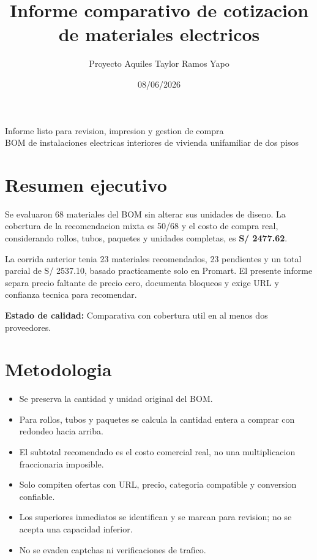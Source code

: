 \documentclass[11pt,a4paper]{article}
\title{Informe comparativo de cotizacion de materiales electricos}
\author{Proyecto Aquiles Taylor Ramos Yapo}
\date{08/06/2026}
\begin{document}
\maketitle
\thispagestyle{empty}
\vfill
\begin{center}
\large Informe listo para revision, impresion y gestion de compra\\[8pt]
\normalsize BOM de instalaciones electricas interiores de vivienda unifamiliar de dos pisos
\end{center}
\vfill
\newpage
\tableofcontents
\newpage

\section{Resumen ejecutivo}
Se evaluaron 68 materiales del BOM sin alterar sus unidades de diseno. La cobertura de la recomendacion mixta es 50/68 y el costo de compra real, considerando rollos, tubos, paquetes y unidades completas, es \textbf{S/ 2477.62}.

La corrida anterior tenia 23 materiales recomendados, 23 pendientes y un total parcial de S/ 2537.10, basado practicamente solo en Promart. El presente informe separa precio faltante de precio cero, documenta bloqueos y exige URL y confianza tecnica para recomendar.

\textbf{Estado de calidad:} Comparativa con cobertura util en al menos dos proveedores.

\section{Metodologia}
\begin{itemize}
\item Se preserva la cantidad y unidad original del BOM.
\item Para rollos, tubos y paquetes se calcula la cantidad entera a comprar con redondeo hacia arriba.
\item El subtotal recomendado es el costo comercial real, no una multiplicacion fraccionaria imposible.
\item Solo compiten ofertas con URL, precio, categoria compatible y conversion confiable.
\item Los superiores inmediatos se identifican y se marcan para revision; no se acepta una capacidad inferior.
\item No se evaden captchas ni verificaciones de trafico.
\end{itemize}
\end{document}
